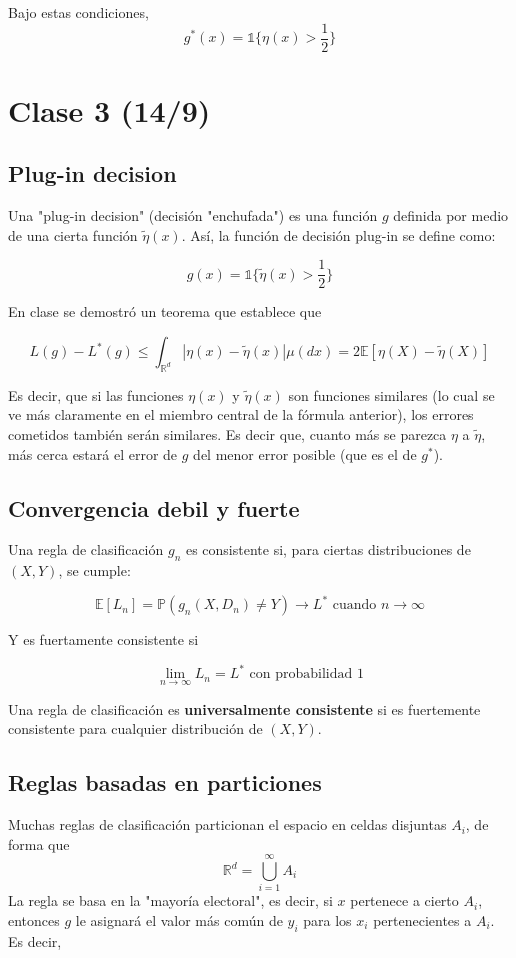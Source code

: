 \documentclass[12pt, a4paper]{article}
\begin{document}
Bajo estas condiciones, $$g^{*}(x)=\mathds{1}\{ \eta(x)>\frac{1}{2} \}$$

\section{Clase 3 (14/9)}

\subsection{Plug-in decision}

Una "plug-in decision" (decisión "enchufada") es una función $g$ definida por medio de una cierta función $\tilde{\eta}(x)$. Así, la función de decisión plug-in se define como:

$$g(x)=\mathds{1}\{ \tilde{\eta}(x) > \frac{1}{2}\}$$

En clase se demostró un teorema que establece que 

$$L(g) - L^{*}(g) \leq \int_{\mathds{R}^d} |\eta(x)-\tilde{\eta}(x)| \mu(dx) = 2 \mathds{E}[ \eta(X) - \tilde { \eta}(X) ]$$

Es decir, que si las funciones $\eta(x)$ y $\tilde{\eta}(x)$ son funciones similares (lo cual se ve más claramente en el miembro central de la fórmula anterior), los errores cometidos también serán similares. Es decir que, cuanto más se parezca $\eta$ a $\tilde{\eta}$, más cerca estará el error de $g$ del menor error posible (que es el de $g^{*}$).
\subsection{Convergencia debil y fuerte}
Una regla de clasificación $g_n$ es consistente si, para ciertas distribuciones de $(X,Y)$, se cumple:

$$\mathds{E}[L_n] = \mathds{P}(g_n(X,D_n)\neq Y) \rightarrow L^{*}\text{ cuando } n \rightarrow \infty$$

Y es fuertamente consistente si 

$$\mathop{lim}_{n \rightarrow \infty} L_n = L^{*} \text{ con probabilidad 1}$$

Una regla de clasificación es \textbf{universalmente consistente} si es fuertemente consistente para cualquier distribución de $(X,Y)$.

\subsection{Reglas basadas en particiones}
Muchas reglas de clasificación particionan el espacio en celdas disjuntas $A_i$, de forma que $$\mathds{R}^d = \mathop{\bigcup}_{i=1}^{\infty}A_i$$
La regla se basa en la "mayoría electoral", es decir, si $x$ pertenece a cierto $A_i$, entonces $g$ le asignará el valor más común de $y_i$ para los $x_i$ pertenecientes a $A_i$. Es decir,
\end{document}

